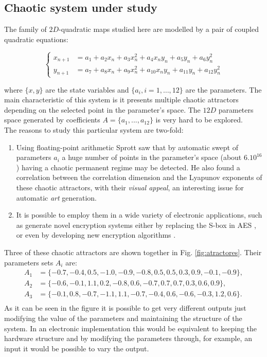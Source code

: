 \subsection{Chaotic system under study}  \label{sec:chaos}

The  family of $2D$-quadratic maps studied here are modelled by a pair of coupled quadratic equations:

\begin{equation}\label{eq:mapaSprott}
 \left\{\begin{aligned}
        x_{n+1}&=a_1+a_2 x_n+a_3 x_n^2+a_4 x_n y_n+a_5 y_n+a_6 y_n^2\\
        y_{n+1}&=a_7+a_8 x_n+a_9 x_n^2+a_{10} x_n y_n+a_{11} y_n+a_{12} y_n^2
       \end{aligned}
 \right.
\end{equation}

where $\{x,y\}$ are the state variables and $\{a_i, i=1,\dots,12\}$
are the parameters. 
The main characteristic of this system is it presents multiple chaotic attractors depending on the selected
point in the parameter's space. The $12D$ parameters space generated by coefficients $A=\{a_1,...,a_{12}\}$  is very hard to be explored. \\
The reasons to study this particular system are two-fold: 

\begin{enumerate}
\item Using floating-point arithmetic Sprott saw
that by automatic swept of parameters $a_i$ a huge number of
points in the parameter's space (about $6  .  10^{16}$) having
a chaotic permanent regime may be detected. He also
found a correlation between the correlation dimension and the
Lyapunov exponents of these chaotic attractors, with their
\textsl{visual appeal}, an interesting issue for automatic
\textsl{art} generation.
\item It is possible to employ them in a wide variety of electronic applications, such as generate novel encryption systems either by replacing the S-box in AES \cite{Ahmad2013,Hussain2013}, or even by developing new encryption algorithms \cite{Machado2004,Smaoui2009}. 
\end{enumerate}

Three of these chaotic attractors are shown together in Fig. \ref{fig:atractores}. Their parameters sets $A_i$ are:
%
\begin{align*}
A_1&=\{-0.7,-0.4,0.5,-1.0,-0.9,-0.8,0.5,0.5,0.3,0.9,-0.1,-0.9\},\nonumber\\
A_2&=\{-0.6,-0.1,1.1,0.2,-0.8,0.6,-0.7,0.7,0.7,0.3,0.6,0.9\}, \nonumber\\
A_3&=\{ -0.1,0.8,-0.7,-1.1,1.1,-0.7,-0.4,0.6,-0.6,-0.3,1.2,0.6\}.\nonumber\\
\end{align*}
%
As it can be seen in the figure it is possible to get very different outputs just modifying the value of the parameters and maintaining the structure of the system. In an electronic implementation this would be equivalent to keeping the hardware structure and by modifying the parameters through, for example, an input it would be possible to vary the output.

